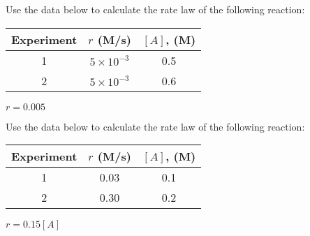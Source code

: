 \documentclass[main.tex]{subfiles}
\begin{document}
\begin{multicols*}{2}
\begin{question}[ID=\the\value{numA}]
Use the data below to calculate the rate law of the following reaction: \begin{center}\end{center}
\begin{center}\begin{tabular}[t]{  c c  c   }
\toprule
 Experiment &$r$ (M/s)	&$[A]$, (M) \\
\midrule
1&	$5\times 10^{-3}$&	0.5\\
2&	$5\times 10^{-3}$ &0.6	\\
\bottomrule
\end{tabular}\end{center}
\end{question}
\begin{solution}
$r=0.005$
\hspace{0.1cm}\end{solution}%


\begin{question}[ID=\the\value{numA}]
Use the data below to calculate the rate law of the following reaction: \begin{center}\end{center}
\begin{center}\begin{tabular}[t]{  c c  c   }
\toprule
 Experiment &$r$ (M/s)	&$[A]$, (M) \\
\midrule
1&	0.03&	0.1\\
2&	0.30 &0.2	\\
\bottomrule
\end{tabular}\end{center}
\end{question}
\begin{solution}
$r=0.15[A]$
\hspace{0.1cm}\end{solution}%


\end{multicols*}
\end{document}
